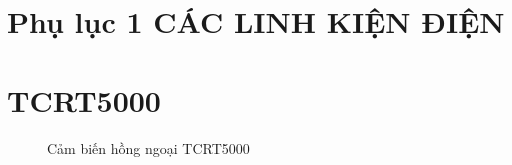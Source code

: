 \section{Phụ lục 1 CÁC LINH KIỆN ĐIỆN}
\label{appendixA}
    \section{TCRT5000}
        \begin{figure}[H]
            \centering
            \caption{Cảm biến hồng ngoại TCRT5000}
            \label{fig:TCRT5000}
        \end{figure}

